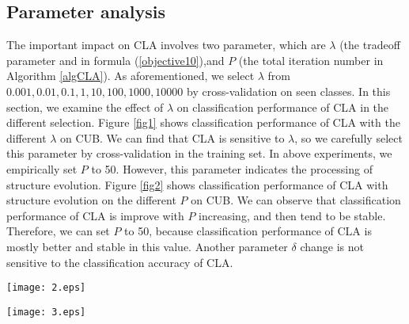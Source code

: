 \documentclass[review]{elsarticle}
\begin{document}
\subsection{Parameter analysis}
The important impact on CLA involves two parameter, which are $\lambda$ (the tradeoff parameter and in formula (\ref{objective10}),and $P$ (the total iteration number in Algorithm \ref{algCLA}). As aforementioned, we select $\lambda$ from $0.001,0.01,0.1, 1, 10, 100, 1000, 10000$ by cross-validation on seen classes. In this section, we examine the effect of $\lambda$ on classification performance of CLA in the different selection. Figure \ref{fig1} shows classification performance of CLA with the different $\lambda$ on CUB. We can find that CLA is sensitive to $\lambda$, so we carefully select this parameter by cross-validation in the training set. In above experiments, we empirically set $P$ to 50. However, this parameter indicates the processing of structure evolution. Figure \ref{fig2} shows classification performance of CLA with structure evolution on the different $P$ on CUB. We can observe that classification performance of CLA is improve with $P$ increasing, and then tend to be stable. Therefore, we can set $P$ to 50, because classification performance of CLA is mostly better and stable in this value. Another parameter $\delta$ change is not sensitive to the classification accuracy of CLA.

\begin{figure*}[ht]
  \begin{center}
\texttt{[image: 2.eps]}
\end{center}
\vspace{-0.2in}
 \caption{Impact of $\lambda$ on classification performance for zero-shot learning on CUB in att semantic space.}
  \label{fig1}
 \end{figure*}

 \begin{figure*}[ht]
  \begin{center}
\texttt{[image: 3.eps]}
\end{center}
\vspace{-0.2in}
 \caption{Impact of $P$ on classification performance for zero-shot learning on CUB in att semantic space.}
  \label{fig2}
 \end{figure*}
\end{document}
